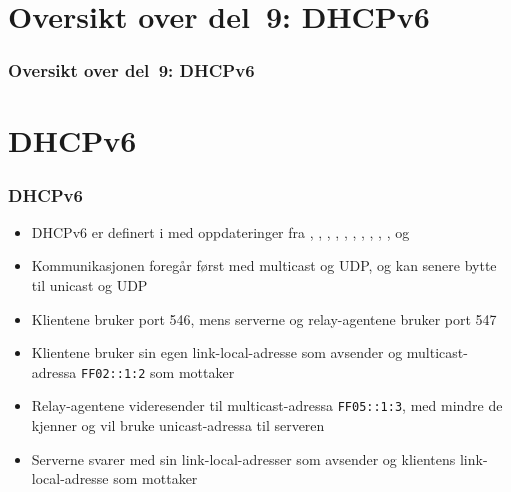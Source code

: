 \section*{Oversikt over del~9: DHCPv6}
\begin{frame}[allowframebreaks]
  \frametitle{Oversikt over del~9: DHCPv6}
    \tableofcontents%
\end{frame}

\section{DHCPv6}
\begin{frame}%
  \frametitle{DHCPv6}
  \pause
  \begin{itemize}[<+->]
  \item DHCPv6 er definert i  med oppdateringer fra
    , , , , ,
    , , , , ,
     og 
  \item Kommunikasjonen foregår først med multicast og UDP, og kan
    senere bytte til unicast og UDP
  \item Klientene bruker port 546, mens serverne og relay-agentene
    bruker port 547
  \item Klientene bruker sin egen link-local-adresse som avsender og
    multicast-adressa \texttt{FF02::1:2} som mottaker
  \item Relay-agentene videresender til multicast-adressa
    \texttt{FF05::1:3}, med mindre de kjenner og vil bruke
    unicast-adressa til serveren
  \item Serverne svarer med sin link-local-adresser som avsender og
    klientens link-local-adresse som mottaker
  \end{itemize}
\end{frame}

